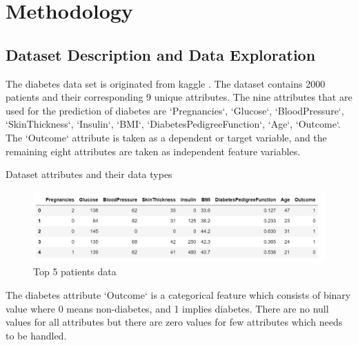 \chapter{Methodology}
\label{ch:method} %
\section{Dataset Description and Data Exploration}
The diabetes data set is originated from kaggle \citep{dataset}. The dataset contains 2000 patients and their corresponding 9 unique attributes. The nine attributes that are used for the prediction of diabetes are `Pregnancies`, 
`Glucose`, `BloodPressure`, `SkinThickness`, `Insulin`, `BMI`, `DiabetesPedigreeFunction`, 
`Age`, `Outcome`. The `Outcome` attribute is taken as a dependent or target variable, and the remaining eight attributes are taken as independent feature variables. 
 \begin{table}[ht!]
    \centering
    \caption{Dataset attributes and their data types}
    
    \label{tab:table-03-data-info}
\end{table}

\begin{figure}[ht]
    \centering    \includegraphics[scale=0.8]{figures/data_top5.pdf}
    \caption{Top 5 patients data}
    \label{fig:capture_b}
\end{figure}

The diabetes attribute `Outcome` is a categorical feature which consists of binary value where 0 means non-diabetes, and 1 implies diabetes. There are no null values for all attributes but there are zero values for few attributes which needs to be handled.


